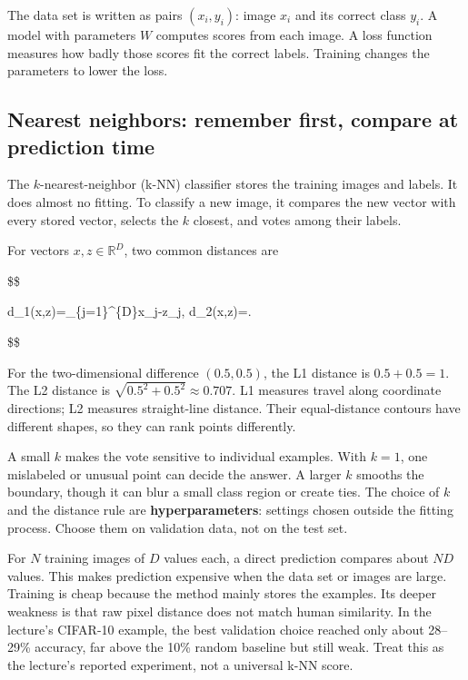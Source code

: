 The data set is written as pairs \((x_i,y_i)\): image \(x_i\) and its correct class \(y_i\). A model with parameters \(W\) computes scores from each image. A loss function measures how badly those scores fit the correct labels. Training changes the parameters to lower the loss.

\subsection{Nearest neighbors: remember first, compare at prediction time}\label{04-visual-computing-ii-ch031-nearest-neighbors-remember-first-compare-at-prediction-time}

The \(k\)-nearest-neighbor (k-NN) classifier stores the training images and labels. It does almost no fitting. To classify a new image, it compares the new vector with every stored vector, selects the \(k\) closest, and votes among their labels.

For vectors \(x,z\in\mathbb{R}^D\), two common distances are

\$\$

d\_1(x,z)=\sum\_\{j=1\}\^{}\{D\}\textbar x\_j-z\_j\textbar, \qquad d\_2(x,z)=.

\$\$

For the two-dimensional difference \((0.5,0.5)\), the L1 distance is \(0.5+0.5=1\). The L2 distance is \(\sqrt{0.5^2+0.5^2}\approx0.707\). L1 measures travel along coordinate directions; L2 measures straight-line distance. Their equal-distance contours have different shapes, so they can rank points differently.

A small \(k\) makes the vote sensitive to individual examples. With \(k=1\), one mislabeled or unusual point can decide the answer. A larger \(k\) smooths the boundary, though it can blur a small class region or create ties. The choice of \(k\) and the distance rule are \textbf{hyperparameters}: settings chosen outside the fitting process. Choose them on validation data, not on the test set.

For \(N\) training images of \(D\) values each, a direct prediction compares about \(ND\) values. This makes prediction expensive when the data set or images are large. Training is cheap because the method mainly stores the examples. Its deeper weakness is that raw pixel distance does not match human similarity. In the lecture's CIFAR-10 example, the best validation choice reached only about 28--29\% accuracy, far above the 10\% random baseline but still weak. Treat this as the lecture's reported experiment, not a universal k-NN score.

